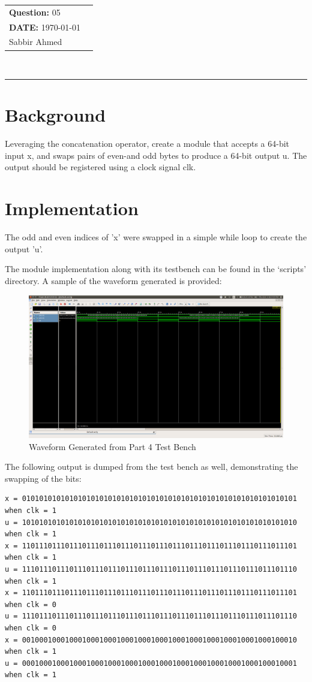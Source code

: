 \documentclass[paper=usletter, fontsize=12pt]{article}
\newcommand{\documentinfo}[3]{
    \begin{centering}
        \parbox{2in}{
        \begin{spacing}{1}
            \begin{flushleft}
                \begin{tabular}{l l}
                    #1 \\
                    #2 \\
                    #3 \\
                \end{tabular}\\
                \rule{\textwidth}{1pt}
            \end{flushleft}
        \end{spacing}
        }
    \end{centering}
}
\begin{document}
    \documentinfo{\textbf{Question:} 05}{\textbf{DATE:} \today}{Sabbir Ahmed}
    \vspace{-0.1in}

    \section{Background}
    Leveraging the concatenation operator, create a module that accepts a 64-bit input x, and swaps pairs of even-and odd bytes to produce a 64-bit output u. The output should be registered using a clock signal clk.

    \section{Implementation}
    The odd and even indices of 'x' were swapped in a simple while loop to create the output 'u'.

    The module implementation along with its testbench can be found in the `scripts' directory. A sample of the waveform generated is provided:

    \begin{figure}[ht]
        \begin{center}
            \includegraphics[width=1\textwidth]{wav.png}
            \caption{Waveform Generated from Part 4 Test Bench} \label{fig:wav}
        \end{center}
    \end{figure}

    The following output is dumped from the test bench as well, demonstrating the swapping of the bits:

\begin{lstlisting}[language={}]
x = 0101010101010101010101010101010101010101010101010101010101010101 when clk = 1
u = 1010101010101010101010101010101010101010101010101010101010101010 when clk = 1
x = 1101110111011101110111011101110111011101110111011101110111011101 when clk = 1
u = 1110111011101110111011101110111011101110111011101110111011101110 when clk = 1
x = 1101110111011101110111011101110111011101110111011101110111011101 when clk = 0
u = 1110111011101110111011101110111011101110111011101110111011101110 when clk = 0
x = 0010001000100010001000100010001000100010001000100010001000100010 when clk = 1
u = 0001000100010001000100010001000100010001000100010001000100010001 when clk = 1
\end{lstlisting}
\end{document}
